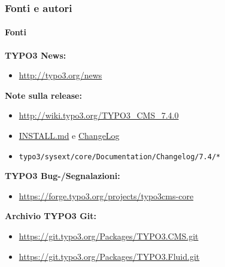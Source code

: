 \begin{frame}[fragile]
	\frametitle{Fonti e autori}
	\framesubtitle{Fonti}

	\textbf{TYPO3 News:}
		\begin{itemize}\smaller
			\item \url{http://typo3.org/news}
		\end{itemize}

	\textbf{Note sulla release:}
		\begin{itemize}\smaller
			\item \url{http://wiki.typo3.org/TYPO3_CMS_7.4.0}
			\item \href{https://github.com/TYPO3/TYPO3.CMS/blob/master/INSTALL.md}{INSTALL.md} e \href{https://github.com/TYPO3/TYPO3.CMS/blob/master/ChangeLog}{ChangeLog}
			\item \texttt{typo3/sysext/core/Documentation/Changelog/7.4/*}
		\end{itemize}

	\textbf{TYPO3 Bug-/Segnalazioni:}
		\begin{itemize}\smaller
			\item \url{https://forge.typo3.org/projects/typo3cms-core}
		\end{itemize}

	\textbf{Archivio TYPO3 Git:}
		\begin{itemize}\smaller
			\item \url{https://git.typo3.org/Packages/TYPO3.CMS.git}
			\item \url{https://git.typo3.org/Packages/TYPO3.Fluid.git}
		\end{itemize}

\end{frame}



